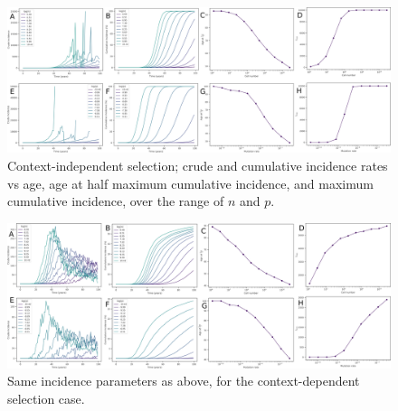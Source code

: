 \documentclass[a0,landscape]{a0poster}
\begin{document}
\begin{multicols}{3}
		\begin{flushleft}
			\begin{figure}[H]
				\includegraphics[width=\linewidth]{fig5.png}
				\caption{Context-independent selection; crude and cumulative incidence rates vs age, age at half maximum cumulative incidence, and maximum cumulative incidence, over the range of $n$ and $p$.}
			\end{figure}
			\begin{figure}[H]
				\includegraphics[width=\linewidth]{fig6.png}
				\caption{Same incidence parameters as above, for the context-dependent selection case.}
			\end{figure}
		\end{flushleft}
		

\end{multicols}
\end{document}
